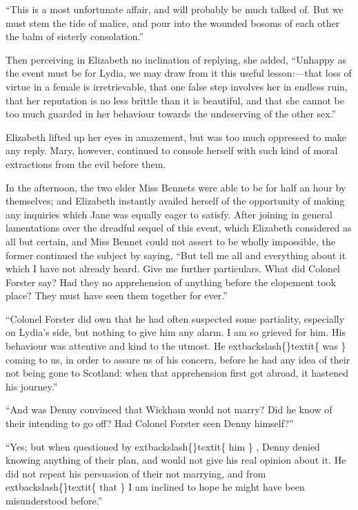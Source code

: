 \documentclass[10pt]{book}
\begin{document}
   “This is a most unfortunate affair, and will probably be much talked of.
But we must stem the tide of malice, and pour into the wounded bosoms of
each other the balm of sisterly consolation.”
  

   Then perceiving in Elizabeth no inclination of replying, she added,
“Unhappy as the event must be for Lydia, we may draw from it this useful
lesson:—that loss of virtue in a female is irretrievable, that one
false step involves her in endless ruin, that her reputation is no less
brittle than it is beautiful, and that she cannot be too much guarded in
her behaviour towards the undeserving of the other sex.”
  

   Elizabeth lifted up her eyes in amazement, but was too much oppressed to
make any reply. Mary, however, continued to console herself with such
kind of moral extractions from the evil before them.
  

   In the afternoon, the two elder Miss Bennets were able to be for half an
hour by themselves; and Elizabeth instantly availed herself of the
opportunity of making any inquiries which Jane was equally eager to
satisfy. After joining in general lamentations over the dreadful sequel
of this event, which Elizabeth considered as all but certain, and Miss
Bennet could not assert to be wholly impossible, the former continued
the subject by saying, “But tell me all and everything about it which I
have not already heard. Give me further particulars. What did Colonel
Forster say? Had they no
   apprehension of anything before the elopement
took place? They must have seen them together for ever.”
  

   “Colonel Forster did own that he had often suspected some partiality,
especially on Lydia’s side, but nothing to give him any alarm. I am so
grieved for him. His behaviour was attentive and kind to the utmost. He
   	extbackslash\{\}textit\{
    was
   \}
   coming to us, in order to assure us of his concern, before he had
any idea of their not being gone to Scotland: when that apprehension
first got abroad, it hastened his journey.”
  

   “And was Denny convinced that Wickham would not marry? Did he know of
their intending to go off? Had Colonel Forster seen Denny himself?”
  

   “Yes; but when questioned by
   	extbackslash\{\}textit\{
    him
   \}
   , Denny denied knowing anything of
their plan, and would not give his real opinion about it. He did not
repeat his persuasion of their not marrying, and from
   	extbackslash\{\}textit\{
    that
   \}
   I am
inclined to hope he might have been misunderstood before.”
  
\end{document}
